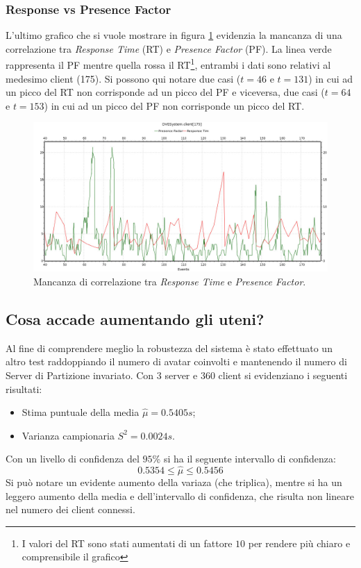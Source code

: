 \documentclass[a4paper, 11pt, oneside]{book}
\theoremstyle{definition}
\theoremstyle{remark}
\begin{document}
\subsubsection{Response vs Presence Factor}
L'ultimo grafico che si vuole mostrare in figura \ref{responseVSPresence}
evidenzia la mancanza di una correlazione tra \emph{Response Time} (RT) e
\emph{Presence Factor} (PF). La linea verde rappresenta il PF mentre quella
rossa il RT\footnote{I valori del RT sono stati aumentati di un fattore $10$ per
rendere più chiaro e comprensibile il grafico}, entrambi i dati sono relativi al
medesimo client (175).
Si possono qui notare due casi ($t = 46$ e $t = 131$) in cui ad un picco
del RT non corrisponde ad un picco del PF e viceversa, due casi
($t = 64$ e $t = 153$) in cui ad un picco del PF non corrisponde un picco
del RT.

\begin{figure}
\begin{center}
\includegraphics[scale=0.4]{responseVSpresence.jpeg}
\end{center}
\caption{Mancanza di correlazione tra \emph{Response Time} e
\emph{Presence Factor}.}
\label{responseVSPresence}
\end{figure}

\subsection{Cosa accade aumentando gli uteni?}
Al fine di comprendere meglio la robustezza del sistema è stato effettuato
un altro test raddoppiando il numero di avatar coinvolti e mantenendo il numero
di Server di Partizione invariato. Con $3$ server e $360$ client si evidenziano
i seguenti risultati:
\begin{itemize}
\item
Stima puntuale della media $\hat{\mu} = 0.5405s$;
\item
Varianza campionaria $S^2 = 0.0024s$.
\end{itemize}
Con un livello di confidenza del $95$\% si ha il seguente intervallo di
confidenza:
\[
0.5354 \le \hat{\mu} \le 0.5456
\]
Si può notare un evidente aumento della variaza (che triplica), mentre si ha
un leggero aumento della media e dell'intervallo di confidenza, che risulta
non lineare nel numero dei client connessi.
\end{document}
